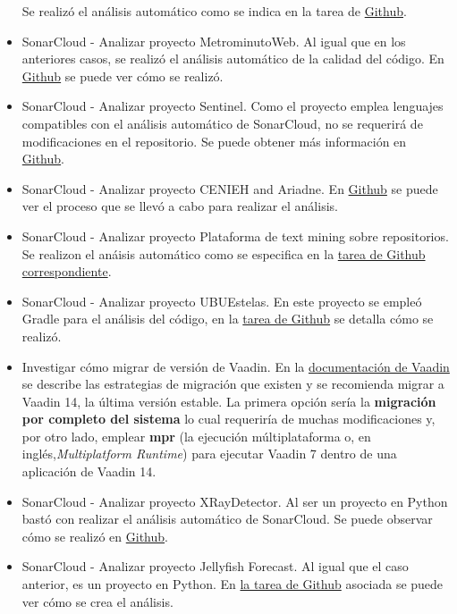 \begin{itemize}
		Se realizó el análisis automático como se indica en la tarea de \href{https://github.com/dbo1001/Gestor-TFG-2021/issues/80}{Github}.
	\item SonarCloud - Analizar proyecto MetrominutoWeb. 
		Al igual que en los anteriores casos, se realizó el análisis automático de la calidad del código. En \href{https://github.com/dbo1001/Gestor-TFG-2021/issues/81}{Github} se puede ver cómo se realizó.
	\item SonarCloud - Analizar proyecto Sentinel. 
		Como el proyecto emplea lenguajes compatibles con el análisis automático de SonarCloud, no se requerirá de modificaciones en el repositorio. Se puede obtener más información en \href{https://github.com/dbo1001/Gestor-TFG-2021/issues/82}{Github}.
	\item SonarCloud - Analizar proyecto CENIEH and Ariadne. 
		En \href{https://github.com/dbo1001/Gestor-TFG-2021/issues/84}{Github} se puede ver el proceso que se llevó a cabo para realizar el análisis.
	\item SonarCloud - Analizar proyecto Plataforma de text mining sobre repositorios. 
		Se realizon el anáisis automático como se especifica en la \href{https://github.com/dbo1001/Gestor-TFG-2021/issues/83}{tarea de Github correspondiente}.
	\item SonarCloud - Analizar proyecto UBUEstelas. 	
		En este proyecto se empleó Gradle para el análisis del código, en la \href{https://github.com/dbo1001/Gestor-TFG-2021/issues/77}{tarea de Github} se detalla cómo se realizó.
	\item Investigar cómo migrar de versión de Vaadin.  
		En la \href{https://vaadin.com/docs/v14/guide/upgrading/v8}{documentación de Vaadin} se describe las estrategias de migración que existen y se recomienda migrar a Vaadin 14, la última versión estable. 
		La primera opción sería la \textbf{migración por completo del sistema} lo cual requeriría de muchas modificaciones y, por otro lado, emplear \textbf{mpr} (la ejecución múltiplataforma o, en inglés,\emph{Multiplatform Runtime}) para ejecutar Vaadin 7 dentro de una aplicación de Vaadin 14.
	\item SonarCloud - Analizar proyecto XRayDetector. 
		Al ser un proyecto en Python bastó con realizar el análisis automático de SonarCloud. Se puede observar cómo se realizó en \href{https://github.com/dbo1001/Gestor-TFG-2021/issues/90}{Github}.
	\item SonarCloud - Analizar proyecto Jellyfish Forecast. 
		Al igual que el caso anterior, es un proyecto en Python. En \href{https://github.com/dbo1001/Gestor-TFG-2021/issues/85}{la tarea de Github} asociada se puede ver cómo se crea el análisis.

\end{itemize}
